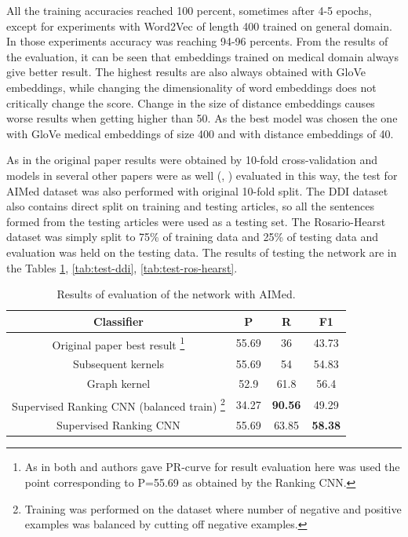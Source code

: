 All the training accuracies reached 100 percent, sometimes after 4-5 epochs, except for experiments with Word2Vec of length 400 trained on general domain. In those experiments accuracy was reaching 94-96 percents.
From the results of the evaluation, it can be seen that embeddings trained on medical domain always 
give better result. The highest results are also always obtained with GloVe embeddings, while changing 
the dimensionality of word embeddings does not critically change the score. Change in the size 
of distance embeddings causes worse results when getting higher than 50. As the best model 
was chosen the one with GloVe medical embeddings of size 400 and with distance embeddings 
of 40.

As in the original paper \cite{bunescu2005comparative} results were obtained by 10-fold 
cross-validation and models in several other papers were as well 
(\cite{bunescu2005subsequence}, \cite{airola2008all}) evaluated in this way, the test for AIMed 
dataset was also performed with original 10-fold split. The DDI dataset also contains direct split on 
training and testing articles, so all the sentences formed from the testing articles were used as a 
testing set. The Rosario-Hearst dataset was simply split to 75\% of training data and 25\% of testing 
data and evaluation was held on the testing data. The results of testing 
the network are in the Tables \ref{tab:test-aimed}, \ref{tab:test-ddi}, \ref{tab:test-ros-hearst}.

\begin{table}[h]
  \begin{center}
 \begin{tabular}{ | c | c | c | c | }
    \hline
    Classifier & P & R & F1 \\ \hline
    Original paper best result \cite{bunescu2005comparative} \footnote{As in both \cite{bunescu2005comparative} and \cite{bunescu2005subsequence} authors gave PR-curve for result evaluation here was used the point corresponding to P=55.69 as obtained by the Ranking CNN.} & 55.69 & 36 & 43.73 \\\hline
    Subsequent kernels \cite{bunescu2005subsequence} & 55.69 & 54 & 54.83 \\\hline
    Graph kernel \cite{airola2008all} & 52.9 & 61.8 & 56.4  \\ \hline
    Supervised Ranking CNN (balanced train) \footnote{Training was performed on the dataset where number of negative and positive examples was balanced by cutting off negative examples.} & 34.27 & \textbf{90.56} & 49.29 \\ \hline
    Supervised Ranking CNN  & 55.69 & 63.85 & \textbf{58.38}  \\ \hline
    \end{tabular}
    \caption[Medical domain, AIMed evaluation results]{Results of evaluation of the network with AIMed.}
\label{tab:test-aimed}
\end{center}
\end{table}

